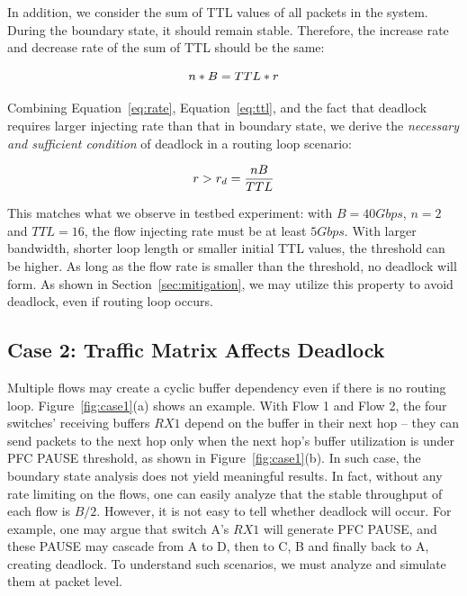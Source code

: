 In addition, we consider the sum of TTL values of all packets in the system. 
During the boundary state, it should remain stable. Therefore, the increase
rate and decrease rate of the sum of TTL should be the same:

\begin{equation}
\small
n * B = TTL * r
\label{eq:ttl}
\end{equation}

Combining Equation~\ref{eq:rate}, Equation~\ref{eq:ttl}, and the fact that
deadlock requires larger injecting rate than that in boundary state, we derive the 
{\em necessary and sufficient condition} of deadlock in a routing loop scenario:

\begin{equation}
\small
r > r_d = \frac{nB}{TTL}
\label{eq:condition}
\end{equation}

This matches what we observe in testbed experiment: with $B=40Gbps$, $n=2$ and
$TTL=16$, the flow injecting rate must be at least $5Gbps$. With larger bandwidth,
shorter loop length or smaller initial TTL values, the threshold can be higher.
As long as the flow rate is smaller than the threshold, no deadlock will form.
As shown in Section~\ref{sec:mitigation}, we may utilize this property to avoid deadlock, 
even if routing loop occurs. 

\subsection{Case 2: Traffic Matrix Affects Deadlock}

Multiple flows may create a cyclic buffer dependency even if there is no routing loop.
Figure~\ref{fig:case1}(a) shows an example. With Flow 1 and Flow 2, the four switches' receiving buffers $RX1$ 
depend on the buffer in their next hop -- they can send packets to the next hop only 
when the next hop's buffer utilization is under PFC PAUSE threshold, as shown in 
Figure~\ref{fig:case1}(b). In such case, the boundary state analysis does not yield meaningful
results. In fact, without any rate limiting on the flows, one can easily analyze that the 
stable throughput of each flow is $B/2$. However, it is not easy to tell whether deadlock 
will occur. For example, one may argue that switch A's $RX1$ will generate PFC PAUSE, and 
these PAUSE may cascade from A to D, then to C, B and finally back to A, creating deadlock.
To understand such scenarios, we must analyze and simulate them at packet level.



